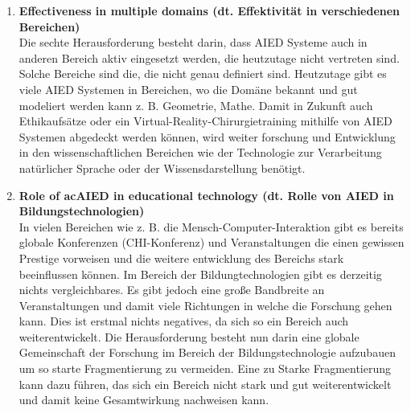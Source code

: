 \begin{enumerate}
    \item \textbf{Effectiveness in multiple domains (dt. Effektivität in verschiedenen Bereichen)} \\
          Die sechte Herausforderung besteht darin, dass AIED Systeme auch in anderen Bereich aktiv eingesetzt werden, die heutzutage nicht vertreten sind. Solche Bereiche sind die, die nicht genau definiert sind.
          Heutzutage gibt es viele AIED Systemen in Bereichen, wo die Domäne bekannt und gut modeliert werden kann z. B. Geometrie, Mathe.
          Damit in Zukunft auch Ethikaufsätze oder ein Virtual-Reality-Chirurgietraining mithilfe von AIED Systemen abgedeckt werden können, wird weiter forschung und Entwicklung in den wissenschaftlichen Bereichen wie der Technologie zur Verarbeitung natürlicher Sprache oder der Wissensdarstellung benötigt. \cite[S. 11f]{Pinkwart.2016}


    \item \textbf{Role of ac{AIED} in educational technology (dt. Rolle von \ac{AIED} in Bildungstechnologien)} \\
          In vielen Bereichen wie z. B. die Mensch-Computer-Interaktion gibt es bereits globale Konferenzen (CHI-Konferenz) und Veranstaltungen die einen gewissen Prestige vorweisen und die weitere entwicklung des Bereichs stark beeinflussen können.
          Im Bereich der Bildungtechnologien gibt es derzeitig nichts vergleichbares.
          Es gibt jedoch eine große Bandbreite an Veranstaltungen und damit viele Richtungen in welche die Forschung gehen kann.
          Dies ist erstmal nichts negatives, da sich so ein Bereich auch weiterentwickelt.
          Die Herausforderung besteht nun darin eine globale Gemeinschaft der Forschung im Bereich der Bildungstechnologie aufzubauen um so starte Fragmentierung zu vermeiden.
          Eine zu Starke Fragmentierung kann dazu führen, das sich ein Bereich nicht stark und gut weiterentwickelt und damit keine Gesamtwirkung nachweisen kann. \cite[S. 12]{Pinkwart.2016}

\end{enumerate}